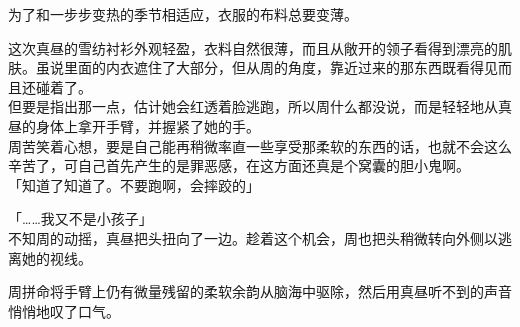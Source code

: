 为了和一步步变热的季节相适应，衣服的布料总要变薄。

这次真昼的雪纺衬衫外观轻盈，衣料自然很薄，而且从敞开的领子看得到漂亮的肌肤。虽说里面的内衣遮住了大部分，但从周的角度，靠近过来的那东西既看得见而且还碰着了。\\

但要是指出那一点，估计她会红透着脸逃跑，所以周什么都没说，而是轻轻地从真昼的身体上拿开手臂，并握紧了她的手。\\

周苦笑着心想，要是自己能再稍微率直一些享受那柔软的东西的话，也就不会这么辛苦了，可自己首先产生的是罪恶感，在这方面还真是个窝囊的胆小鬼啊。\\

「知道了知道了。不要跑啊，会摔跤的」

「……我又不是小孩子」\\

不知周的动摇，真昼把头扭向了一边。趁着这个机会，周也把头稍微转向外侧以逃离她的视线。

周拼命将手臂上仍有微量残留的柔软余韵从脑海中驱除，然后用真昼听不到的声音悄悄地叹了口气。
